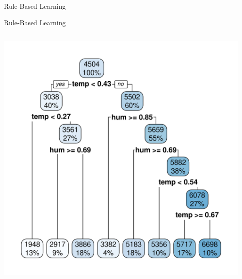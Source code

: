 \documentclass[11pt,compress,t,notes=noshow, xcolor=table]{beamer}
\begin{document}
\begin{vbframe}{Rule-Based Learning}
\begin{itemize}
\end{itemize}

\end{vbframe}

\begin{vbframe}{Rule-Based Learning}

\begin{columns}
  \begin{column}{0.5\textwidth}
      \begin{center}
        \includegraphics[width = \textwidth]{figure/rpart_plot.png}     
      \end{center}
  \end{column}
  \begin{column}{0.5\textwidth}
     \tiny
     
  \end{column}
\end{columns}

\end{vbframe}

\endlecture
\end{document}
